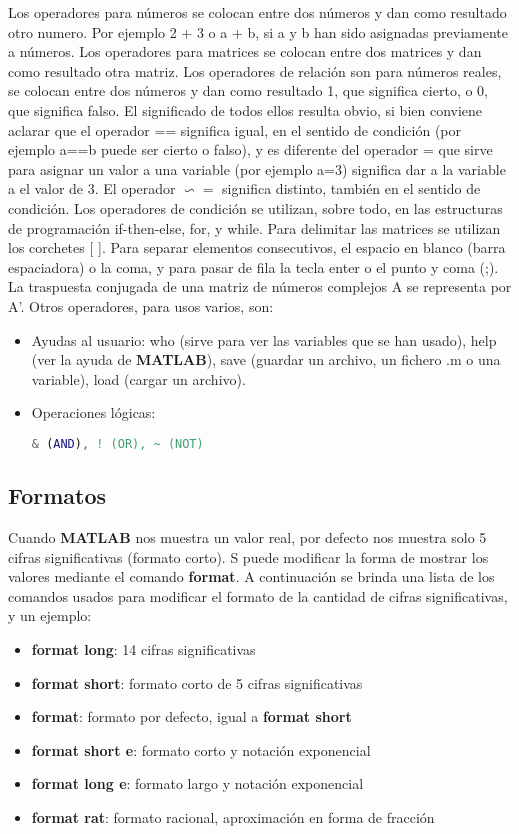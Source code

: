 Los operadores para números se colocan entre dos números y dan como resultado otro numero. Por ejemplo 2 + 3 o a + b, si a y b han sido asignadas previamente a números. Los operadores para matrices se colocan entre dos matrices y dan como resultado otra matriz. Los operadores de relación son para números reales, se colocan entre dos números y dan como resultado 1, que significa cierto, o 0, que significa falso. El significado de todos ellos resulta obvio, si bien conviene aclarar que el operador == significa igual, en el sentido de condición (por ejemplo a==b puede ser cierto o falso), y es diferente del operador = que sirve para asignar un valor a una variable (por ejemplo a=3) significa dar a la variable a el valor de 3. El operador $\backsim=$ significa distinto, también en el sentido de condición. Los operadores de condición se utilizan, sobre todo, en las estructuras de programación if-then-else, for, y while. Para delimitar las matrices se utilizan los corchetes [ ]. Para separar elementos consecutivos,
 el espacio en blanco (barra espaciadora) o la coma, y para pasar de fila la tecla enter o el punto y coma (;). La traspuesta conjugada de una matriz de números complejos A se representa por A'. Otros operadores, para usos varios, son:
\begin{itemize}
\item Ayudas al usuario: who (sirve para ver las variables que se han usado), help (ver la ayuda de \textbf{MATLAB}), save (guardar un archivo, un fichero .m o una variable), load (cargar un archivo).
\item Operaciones lógicas: 
\begin{lstlisting}[language=Matlab]
& (AND), ! (OR), ~ (NOT)
\end{lstlisting}
\end{itemize}

\subsection{Formatos}

Cuando \textbf{MATLAB} nos muestra un valor real, por defecto nos muestra solo 5 cifras significativas (formato corto). S puede modificar la forma de mostrar los valores mediante el comando \textbf{format}. A continuación se brinda una lista de los comandos usados para modificar el formato de la cantidad de cifras significativas, y un ejemplo:

\begin{itemize}
\item \textbf{format long}: 14 cifras significativas
\item \textbf{format short}: formato corto de 5 cifras significativas
\item \textbf{format}: formato por defecto, igual a \textbf{format short}
\item \textbf{format short e}: formato corto y notación exponencial
\item \textbf{format long e}: formato largo y notación exponencial
\item \textbf{format rat}: formato racional, aproximación en forma de fracción
\end{itemize}

